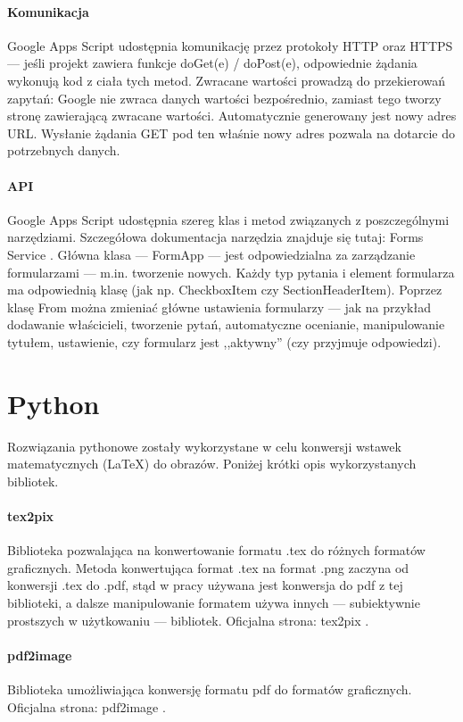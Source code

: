 \paragraph{Komunikacja}
Google Apps Script udostępnia komunikację przez protokoły HTTP oraz HTTPS --- jeśli projekt zawiera funkcje doGet(e) / doPost(e), odpowiednie żądania wykonują kod z ciała tych metod. Zwracane wartości prowadzą do przekierowań zapytań: Google nie zwraca danych wartości bezpośrednio, zamiast tego tworzy stronę zawierającą zwracane wartości. Automatycznie generowany jest nowy adres URL. Wysłanie żądania GET pod ten właśnie nowy adres pozwala na dotarcie do potrzebnych danych. 
\paragraph{API}
Google Apps Script udostępnia szereg klas i metod związanych z poszczególnymi narzędziami. Szczegółowa dokumentacja narzędzia znajduje się tutaj: Forms Service \cite{FormsService}.
 Główna klasa --- FormApp --- jest odpowiedzialna za zarządzanie formularzami --- m.in. tworzenie nowych. Każdy typ pytania i element formularza ma odpowiednią klasę (jak np. CheckboxItem czy SectionHeaderItem). Poprzez klasę From  można zmieniać główne ustawienia formularzy  --- jak na przykład dodawanie właścicieli, tworzenie pytań, automatyczne ocenianie, manipulowanie tytułem, ustawienie, czy formularz jest ,,aktywny'' (czy przyjmuje odpowiedzi).
 
 
\section{Python}
Rozwiązania pythonowe zostały wykorzystane w celu konwersji wstawek matematycznych (\LaTeX{}) do obrazów. Poniżej krótki opis wykorzystanych bibliotek.
\paragraph{tex2pix} Biblioteka pozwalająca na konwertowanie formatu .tex do różnych formatów graficznych. Metoda konwertująca format .tex na format .png zaczyna od konwersji .tex do .pdf, stąd w pracy używana jest konwersja do pdf z tej biblioteki, a dalsze manipulowanie formatem używa innych --- subiektywnie prostszych w użytkowaniu --- bibliotek. 
\ind Oficjalna strona: tex2pix \cite{tex2pix}.

\paragraph{pdf2image} Biblioteka  umożliwiająca konwersję formatu pdf do formatów graficznych.
\ind Oficjalna strona: pdf2image \cite{pdf2image}.
